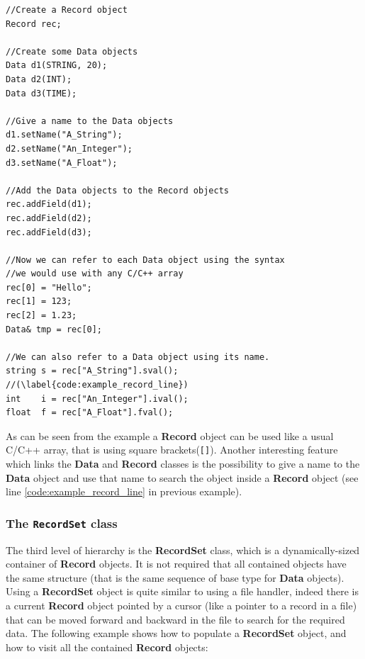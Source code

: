 \documentclass[12pt,titlepage]{article}
\begin{document}
\begin{lstlisting}
//Create a Record object
Record rec;

//Create some Data objects
Data d1(STRING, 20);
Data d2(INT);
Data d3(TIME);

//Give a name to the Data objects
d1.setName("A_String");
d2.setName("An_Integer");
d3.setName("A_Float");

//Add the Data objects to the Record objects
rec.addField(d1);
rec.addField(d2);
rec.addField(d3);

//Now we can refer to each Data object using the syntax
//we would use with any C/C++ array
rec[0] = "Hello";
rec[1] = 123;
rec[2] = 1.23;
Data& tmp = rec[0];

//We can also refer to a Data object using its name.
string s = rec["A_String"].sval(); //(\label{code:example_record_line})
int    i = rec["An_Integer"].ival();
float  f = rec["A_Float"].fval();
\end{lstlisting}

\noindent
As can be seen from the example a \textbf{Record} object can be used
like a usual C/C++ array, that is using square brackets(\verb|[]|).
Another interesting feature which links the \textbf{Data} and
\textbf{Record} classes is the possibility to give a name to the
\textbf{Data} object and use that name to search the object inside a
\textbf{Record} object (see line \ref{code:example_record_line} in
previous example).

\subsubsection{The \texttt{RecordSet} class}
\label{sec:The RecordSet class}
The third level of hierarchy is the \textbf{RecordSet} class, which is a
dynamically-sized container of \textbf{Record} objects. It is not required
that all contained objects have the same structure (that is the same sequence
of base type for \textbf{Data} objects). Using a \textbf{RecordSet} object is
quite similar to using a file handler, indeed there is a current
\textbf{Record} object pointed by a cursor (like a pointer to a record in a
file) that can be moved forward and backward in the file to search for the
required data. The following example shows how to populate a
\textbf{RecordSet} object, and how to visit all the contained \textbf{Record}
objects:
\end{document}
